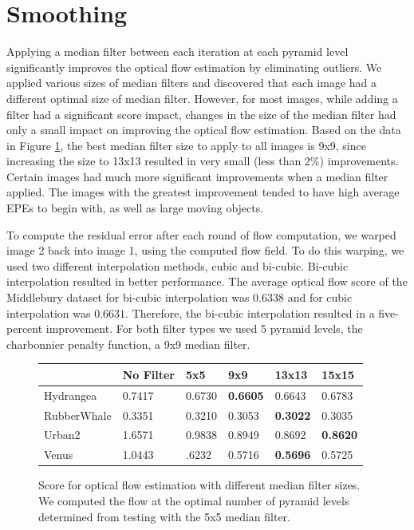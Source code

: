\documentclass[10pt,twocolumn,letterpaper]{article}
\begin{document}
\section{Smoothing}
Applying a median filter between each iteration at each pyramid level significantly improves the optical flow estimation by eliminating outliers. We applied various sizes of median filters and discovered that each image had a different optimal size of median filter. However, for most images, while adding a filter had a significant score impact, changes in the size of the median filter had only a small impact on improving the optical flow estimation.  Based on the data in Figure \ref{fig:medFiltTable}, the best median filter size to apply to all images is 9x9, since increasing the size to 13x13 resulted in very small (less than 2\%) improvements. Certain images had much more significant improvements when a median filter applied.  The images with the greatest improvement tended to have high average EPEs to begin with, as well as large moving objects.

To compute the residual error after each round of flow computation, we warped image 2 back into image 1, using the computed flow field.  To do this warping, we used two different interpolation methods, cubic and bi-cubic. Bi-cubic interpolation resulted in better performance. The average optical flow score of the Middlebury dataset for bi-cubic interpolation was $0.6338$ and for cubic interpolation was $0.6631$. Therefore, the bi-cubic interpolation resulted in a five-percent improvement. For both filter types we used 5 pyramid levels, the charbonnier penalty function, a 9x9 median filter.

\begin{figure}
\begin{tabularx}{1.0\textwidth} {|X |X |X |X |X |X|}
\hline
 & No Filter & 5x5 & 9x9 & 13x13 & 15x15 \\
\hline 
Hydrangea & 0.7417 & 0.6730 & \bf{0.6605} & 0.6643 & 0.6783 \\
\hline 
RubberWhale & 0.3351 & 0.3210 & 0.3053 & \bf{0.3022} &  0.3035\\
\hline 
Urban2 &  1.6571 & 0.9838 & 0.8949 & 0.8692 & \bf{0.8620}\\
\hline 
Venus &  1.0443 & .6232 & 0.5716 & \bf{0.5696} &  0.5725 \\
\hline
\end{tabularx}
\caption{Score for optical flow estimation with different median filter sizes. We computed the flow at the optimal number of pyramid levels determined from testing with the 5x5 median filter.}
\label{fig:medFiltTable}
\end{figure}
\end{document}
